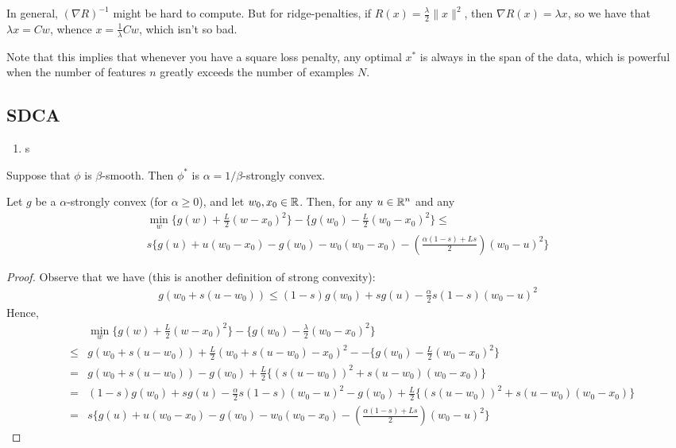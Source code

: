 In general, $(\nabla R)^{-1}$ might be hard to compute. But for ridge-penalties, if $R(x) = \frac{\lambda}{2} \|x\|^2$, then $\nabla R(x) = \lambda x$, so we have that $\lambda x = Cw$, whence $x = \frac{1}{\lambda}Cw$, which isn't so bad. 

Note that this implies that whenever you have a square loss penalty, any optimal $x^*$ is always in the span of the data, which is powerful when the number of features $n$ greatly exceeds the number of examples $N$.
\subsection{SDCA}
\begin{enumerate}
	\item s
\end{enumerate}

\begin{lemma} Suppose that $\phi$ is $\beta$-smooth. Then $\phi^*$ is $\alpha = 1/\beta$-strongly convex. 
\end{lemma}

\begin{lemma}
Let $g$ be a $\alpha$-strongly convex (for $\alpha \ge 0$), and let $w_0,x_0 \in \mathbb{R}$. Then, for any $u \in \mathbb{R}^n$ and any 
\begin{multline}
\min_{w} \{g(w) + \frac{L}{2}(w - x_0 )^2\} - \{g(w_0) - \frac{L}{2}(w_0 - x_0)^2\} \le \\
s\{g(u) + u(w_0 - x_0) - g(w_0) - w_0(w_0 - x_0)  - (\frac{\alpha(1-s) + L s}{2})(w_0 - u)^2\}
\end{multline}
\end{lemma}
\begin{proof} Observe that we have (this is another definition of strong convexity):
\begin{eqnarray}
g(w_0 + s(u - w_0)) \le (1-s)g(w_0) + sg(u) - \frac{\alpha}{2}s(1-s)(w_0 - u)^2
\end{eqnarray}
Hence, 
\begin{eqnarray}
&& \min_{w} \{g(w) + \frac{L}{2}(w - x_0)^2\} - \{g(w_0) - \frac{\lambda}{2}(w_0 - x_0)^2\} \\
&\le& g(w_0 + s(u - w_0)) + \frac{L}{2}(w_0 + s(u - w_0) - x_0)^2 - - \{g(w_0) - \frac{L}{2}(w_0 - x_0)^2\}\\
&=& g(w_0 + s(u - w_0)) - g(w_0) + \frac{L}{2} \{(s(u-w_0))^2 + s(u-w_0)(w_0 - x_0)\}\\
&=& (1-s)g(w_0) + sg(u) - \frac{\alpha}{2}s(1-s)(w_0 - u)^2 - g(w_0) + \frac{L}{2} \{(s(u-w_0))^2 + s(u-w_0)(w_0 - x_0)\}\\
&=& s\{g(u) + u(w_0 - x_0) - g(w_0) - w_0(w_0 - x_0)  - (\frac{\alpha(1-s) + L s}{2})(w_0 - u)^2\}
\end{eqnarray}



\end{proof}

\begin{theorem}[SCDA] 
\end{theorem}

